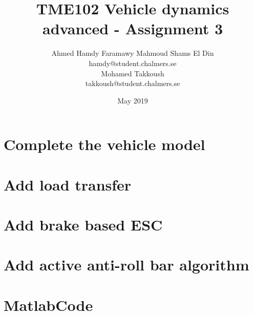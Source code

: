 \documentclass{article}
\author{Ahmed Hamdy Faramawy Mahmoud Shams El Din \\ hamdy@student.chalmers.se\\
Mohamed Takkoush\\
takkoush@student.chalmers.se}
\date{May 2019 }
\title{TME102 Vehicle dynamics advanced - Assignment 3}
\begin{document}
\maketitle

\section{Complete the vehicle model}


\section{Add load transfer}


\section{Add brake based ESC}


\section{Add active anti-roll bar algorithm}


\newpage
\section{MatlabCode}



% 
% 

% 
\end{document}
